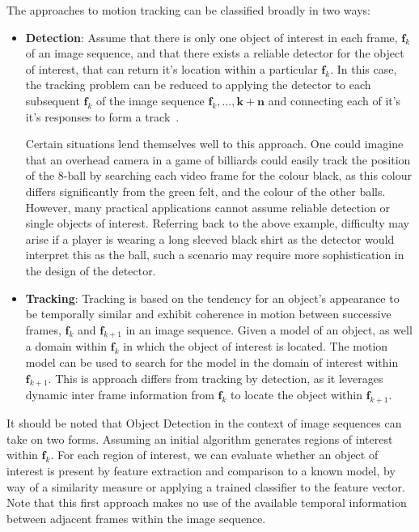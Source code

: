 The approaches to motion tracking can be classified broadly in two ways:
\begin{itemize}
    \item \textbf{Detection}: Assume that there is only one object
        of interest in each frame, $\mathbf{f}_k$ of an image sequence, and that
        there exists a reliable detector for the object of interest, that can
        return it's location within a particular $\mathbf{f}_k$. In this case, the
        tracking problem can be reduced to applying the detector to each
        subsequent $\mathbf{f}_k$ of the image sequence
        $\mathbf{f}_k,\ldots,\mathbf{k+n}$ and connecting each of it's it's
        responses to form a track~\cite{Forsyth2012}.

        Certain situations lend themselves well to this approach. One could
        imagine that an overhead camera in a game of billiards could easily track the
        position of the 8-ball by searching each video frame for the colour black, as
        this colour differs significantly from the green felt, and the colour of the
        other balls. However, many practical applications cannot assume reliable
        detection or single objects of interest.  Referring back to the above example,
        difficulty may arise if a player is wearing a long sleeved black shirt as the
        detector would interpret this as the ball, such a scenario may require more
        sophistication in the design of the detector.

    \item \textbf{Tracking}: Tracking is based on the tendency for an object's
        appearance to be temporally similar and exhibit coherence in motion
        between successive frames, $\mathbf{f}_k$ and $\mathbf{f}_{k+1}$ in an
        image sequence. Given a model of an object, as well a domain within
        $\mathbf{f}_k$ in which the object of interest is located. The motion
        model can be used to search for the model in the domain of interest
        within $\mathbf{f}_{k+1}$.  This is approach differs from tracking by
        detection, as it leverages dynamic inter frame information from
        $\mathbf{f}_k$ to locate the object within $\mathbf{f}_{k+1}$.
\end{itemize}

It should be noted that Object Detection in the context of image sequences can
take on two forms. Assuming an initial algorithm generates regions of interest
within $\mathbf{f}_k$. For each region of interest, we can evaluate whether an
object of interest is present by feature extraction and comparison to a known
model, by way of a similarity measure or applying a trained classifier to the
feature vector. Note that this first approach makes no use of the available
temporal information between adjacent frames within the image sequence. 

